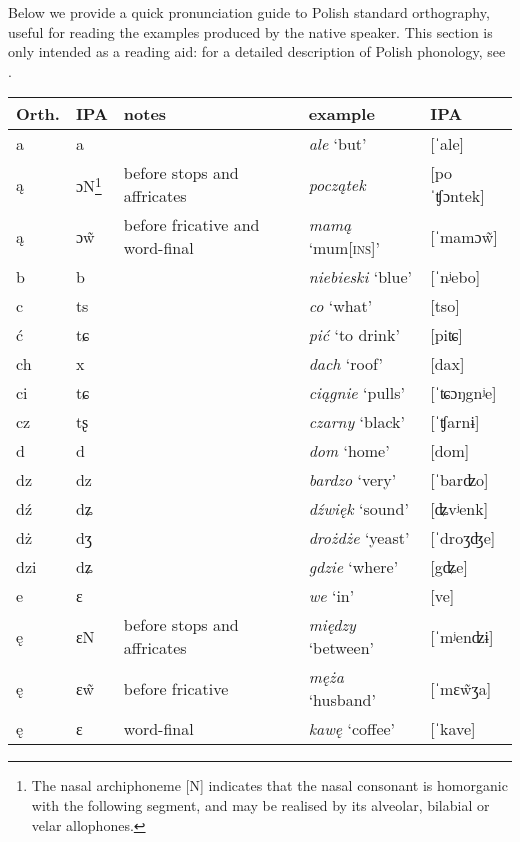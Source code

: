 \appendix
{}\label{sec:9}
Below we provide a quick pronunciation guide to Polish standard orthography, useful for reading the examples produced by the native speaker. This section is only intended as a reading aid: for a detailed description of Polish phonology, see \citet{Gussman2007}.\bigskip

{\centering
\small
    \begin{tabularx}{\textwidth}{llXll}
        \lsptoprule
        Orth. & IPA & notes & example & IPA\\
        \midrule
        a & a &  & \textit{ale} `but' & [ˈale]\\
        ą & ɔN\footnote{The nasal archiphoneme [N] indicates that the nasal consonant is homorganic with the following segment, and may be realised by its alveolar, bilabial or velar allophones.} & before stops  and affricates & \textit{początek} & [poˈʧɔntek]\\
        ą & ɔ\~{w} & before fricative and word-final & \textit{mamą} `mum\textsc{[ins]}' & [ˈmamɔ\~{w}]\\
        b & b &  & \textit{niebieski} `blue' & [ˈnʲebo]\\
        c & ts &  & \textit{co} `what' & [tso]\\
        ć & tɕ &  & \textit{pić} `to drink' & [piʨ]\\
        ch & x &  & \textit{dach} `roof' & [dax]\\
        ci & tɕ &  & \textit{ciągnie} `pulls' & [ˈʨɔŋgnʲe]\\
        cz & tʂ &  & \textit{czarny} `black' & [ˈʧarnɨ]\\
        d & d &  & \textit{dom} `home' & [dom]\\
        dz & dz &  & \textit{bardzo} `very' & [ˈbarʣo]\\
        dź & dʑ &  & \textit{dźwięk} `sound' & [ʥvʲenk]\\
        dż & dʒ &  & \textit{drożdże} `yeast' & [ˈdroʒʤe]\\
        dzi & dʑ &  & \textit{gdzie} `where' & [gʥe]\\
        e & ɛ &  & \textit{we} `in' & [ve]\\
        ę & ɛN & before stops and affricates & \textit{między} `between' & [ˈmʲenʣɨ]\\
        ę & ɛ\~{w} & before fricative & \textit{męża} `husband' & [ˈmɛ\~{w}ʒa]\\
        ę & ɛ & word-final & \textit{kawę} `coffee' & [ˈkave]\\

\end{tabularx}}

